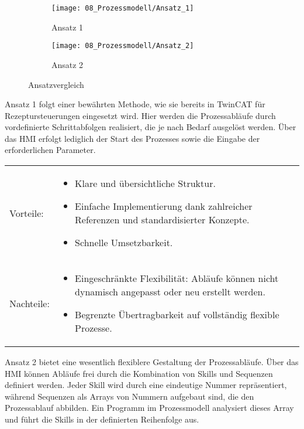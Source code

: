 	\begin{figure}[h!]
		\centering
		\begin{subfigure}[b]{0.42\textwidth}
			\centering
			\texttt{[image: 08\_Prozessmodell/Ansatz\_1]}
			\caption{Ansatz 1}
			\label{fig:Ansatz_1}
		\end{subfigure}
		\hfill
		\begin{subfigure}[b]{0.42\textwidth}
			\centering
			\texttt{[image: 08\_Prozessmodell/Ansatz\_2]}
			\caption{Ansatz 2}
			\label{fig:Ansatz_2}
		\end{subfigure}
		\caption{Ansatzvergleich}
		\label{fig:Ansatzvergleich}
	\end{figure}
	
	Ansatz 1 folgt einer bewährten Methode, wie sie bereits in TwinCAT für Rezeptursteuerungen eingesetzt wird. Hier werden die Prozessabläufe durch vordefinierte Schrittabfolgen realisiert, die je nach Bedarf ausgelöst werden. Über das HMI erfolgt lediglich der Start des Prozesses sowie die Eingabe der erforderlichen Parameter.
	
	\begin{tabularx}{\textwidth}{@{}>{}p{5em} X@{}}
	Vorteile: 	& 	\vspace{-3mm} \begin{itemize}
						\item Klare und übersichtliche Struktur.
						\item Einfache Implementierung dank zahlreicher Referenzen und standardisierter Konzepte.
						\item Schnelle Umsetzbarkeit.
					\end{itemize}
	\\
	Nachteile: 	& 	\vspace{-3mm} \begin{itemize}
						\item Eingeschränkte Flexibilität: Abläufe können nicht dynamisch angepasst oder neu erstellt werden.
						\item Begrenzte Übertragbarkeit auf vollständig flexible Prozesse.
					\end{itemize}
	\\
	\end{tabularx} 
	
	Ansatz 2 bietet eine wesentlich flexiblere Gestaltung der Prozessabläufe. Über das HMI können Abläufe frei durch die Kombination von Skills und Sequenzen definiert werden. Jeder Skill wird durch eine eindeutige Nummer repräsentiert, während Sequenzen als Arrays von Nummern aufgebaut sind, die den Prozessablauf abbilden. Ein Programm im Prozessmodell analysiert dieses Array und führt die Skills in der definierten Reihenfolge aus.
	
